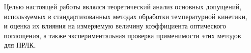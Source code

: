 \documentclass[a4paper,12pt]{article}
\begin{document}
Целью настоящей работы являлся теоретический анализ основных допущений, используемых в стандартизованных методах обработки температурной кинетики, и оценка их влияния на измеряемую величину коэффициента оптического поглощения, а также экспериментальная проверка применимости этих методов для ПРЛК.

\printbibliography
	
\end{document}
